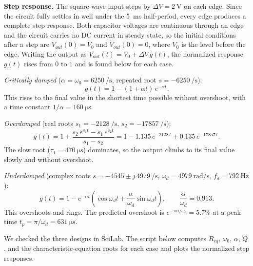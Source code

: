 \documentclass[11pt]{article}
\begin{document}
\textbf{Step response.} The square-wave input steps by $\Delta V = \SI{2}{\volt}$
on each edge. Since the circuit fully settles in well under the \SI{5}{\milli\second}
half-period, every edge produces a complete step response. Both capacitor voltages
are continuous through an edge and the circuit carries no DC current in steady
state, so the initial conditions after a step are $V_{out}(0) = V_0$ and
$\dot{V}_{out}(0) = 0$, where $V_0$ is the level before the edge. Writing the
output as $V_{out}(t) = V_0 + \Delta V\, g(t)$, the normalized response $g(t)$ rises
from $0$ to $1$ and is found below for each case.

\emph{Critically damped} ($\alpha = \omega_0 = 6250\ \si{\per\second}$, repeated
root $s = -6250\ \si{\per\second}$):
\[
    g(t) = 1 - (1 + \alpha t)\, e^{-\alpha t}.
\]
This rises to the final value in the shortest time possible without overshoot,
with a time constant $1/\alpha = \SI{160}{\micro\second}$.

\emph{Overdamped} (real roots $s_1 = -2128\ \si{\per\second}$,
$s_2 = -17857\ \si{\per\second}$):
\[
    g(t) = 1 + \frac{s_2\, e^{s_1 t} - s_1\, e^{s_2 t}}{s_1 - s_2}
         = 1 - 1.135\, e^{-2128\,t} + 0.135\, e^{-17857\,t}.
\]
The slow root ($\tau_1 = \SI{470}{\micro\second}$) dominates, so the output climbs
to its final value slowly and without overshoot.

\emph{Underdamped} (complex roots $s = -4545 \pm j\,4979\ \si{\per\second}$,
$\omega_d = 4979\ \si{\radian\per\second}$, $f_d = \SI{792}{\hertz}$):
\[
    g(t) = 1 - e^{-\alpha t}\!\left( \cos\omega_d t
           + \frac{\alpha}{\omega_d}\sin\omega_d t \right),
    \qquad \frac{\alpha}{\omega_d} = 0.913.
\]
This overshoots and rings. The predicted overshoot is
$e^{-\pi\alpha/\omega_d} = 5.7\%$ at a peak time
$t_p = \pi/\omega_d = \SI{631}{\micro\second}$.

We checked the three designs in SciLab. The script below computes $R_{eq}$,
$\omega_0$, $\alpha$, $Q$, and the characteristic-equation roots for each case
and plots the normalized step responses.
\end{document}
